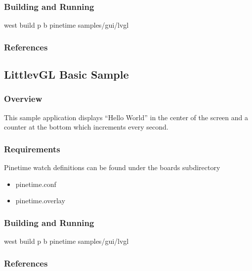 \documentclass[letterpaper,10pt,english]{sphinxmanual}
\begin{document}
\subsubsection{Building and Running}
\label{\detokenize{samples/gui/lvaccel/README:building-and-running}}
west build \sphinxhyphen{}p \sphinxhyphen{}b pinetime samples/gui/lvgl


\subsubsection{References}
\label{\detokenize{samples/gui/lvaccel/README:references}}

\subsection{LittlevGL Basic Sample}
\label{\detokenize{samples/gui/lvgl/README:littlevgl-basic-sample}}\label{\detokenize{samples/gui/lvgl/README:lvgl-sample}}\label{\detokenize{samples/gui/lvgl/README::doc}}

\subsubsection{Overview}
\label{\detokenize{samples/gui/lvgl/README:overview}}
This sample application displays “Hello World” in the center of the screen
and a counter at the bottom which increments every second.


\subsubsection{Requirements}
\label{\detokenize{samples/gui/lvgl/README:requirements}}
Pinetime watch
definitions can be found under the boards sub\sphinxhyphen{}directory
\begin{itemize}
\item {} 
pinetime.conf

\item {} 
pinetime.overlay

\end{itemize}


\subsubsection{Building and Running}
\label{\detokenize{samples/gui/lvgl/README:building-and-running}}
west build \sphinxhyphen{}p \sphinxhyphen{}b pinetime samples/gui/lvgl


\subsubsection{References}
\label{\detokenize{samples/gui/lvgl/README:references}}
\end{document}
